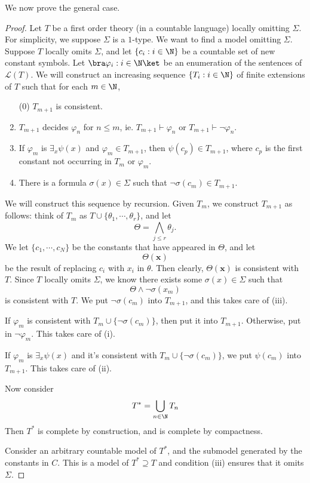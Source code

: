 \documentclass[a4paper]{article}
\begin{document}
We now prove the general case.
\begin{proof}
  Let $T$ be a first order theory (in a countable language) locally omitting $\Sigma$. For simplicity, we suppose $\Sigma$ is a $1$-type. We want to find a model omitting $\Sigma$. Suppose $T$ locally omits $\Sigma$, and let $\{c_i: i \in \N\}$ be a countable set of new constant symbols. Let $\bra \varphi_i: i \in \N\ket$ be an enumeration of the sentences of $\mathcal{L}(T)$. We will construct an increasing sequence $\{ T_i: i \in \N\}$ of finite extensions of $T$ such that for each $m \in \N$,
  \begin{enumerate}
    \item[(0)] $T_{m + 1}$ is consistent.
    \item $T_{m + 1}$ decides $\varphi_n$ for $n \leq m$, ie. $T_{m + 1} \vdash \varphi_n$ or $T_{m + 1} \vdash \neg \varphi_n$.
    \item If $\varphi_m$ is $\exists_x \psi(x)$ and $\varphi_m \in T_{m + 1}$, then $\psi(c_p) \in T_{m + 1}$, where $c_p$ is the first constant not occurring in $T_m$ or $\varphi_m$.
    \item There is a formula $\sigma(x) \in \Sigma$ such that $\neg \sigma(c_m) \in T_{m + 1}$.
  \end{enumerate}
  We will construct this sequence by recursion. Given $T_m$, we construct $T_{m + 1}$ as follows: think of $T_m$ as $T \cup \{\theta_1, \cdots, \theta_r\}$, and let
  \[
    \Theta = \bigwedge_{j \leq r} \theta_j.
  \]
  We let $\{c_1, \cdots, c_N\}$ be the constants that have appeared in $\Theta$, and let
  \[
    \Theta(\mathbf{x})
  \]
  be the result of replacing $c_i$ with $x_i$ in $\theta$. Then clearly, $\Theta(\mathbf{x})$ is consistent with $T$. Since $T$ locally omits $\Sigma$, we know there exists some $\sigma(x) \in \Sigma$ such that
  \[
    \Theta \wedge \neg \sigma(x_m)
  \]
  is consistent with $T$. We put $\neg \sigma(c_m)$ into $T_{m + 1}$, and this takes care of (iii).

  If $\varphi_m$ is consistent with $T_m \cup \{\neg \sigma(c_m)\}$, then put it into $T_{m + 1}$. Otherwise, put in $\neg \varphi_m$. This takes care of (i).

  If $\varphi_m$ is $\exists_x \psi(x)$ and it's consistent with $T_m \cup \{\neg \sigma(c_m)\}$, we put $\psi(c_m)$ into $T_{m + 1}$. This takes care of (ii).

  Now consider
  \[
    T^* = \bigcup_{n \in \N} T_n
  \]
  Then $T^*$ is complete by construction, and is complete by compactness.

  Consider an arbitrary countable model of $T^*$, and the submodel generated by the constants in $C$. This is a model of $T^* \supseteq T$ and condition (iii) ensures that it omits $\Sigma$.
\end{proof}
\end{document}
